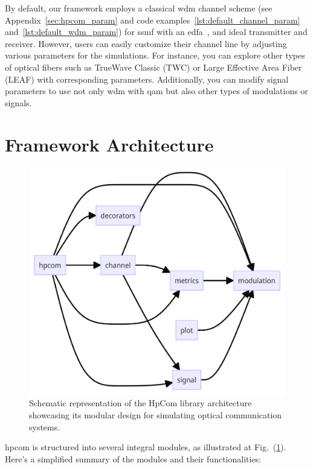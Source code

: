 By default, our framework employs a classical \acrshort{wdm} channel scheme (see Appendix~\ref{sec:hpcom_param} and code examples~\ref{lst:default_channel_param} and~\ref{lst:default_wdm_param}) for \acrshort{ssmf} with an \acrshort{edfa}~\cite{essiambre2010capacity}, and ideal transmitter and receiver. However, users can easily customize their channel line by adjusting various parameters for the simulations. For instance, you can explore other types of optical fibers such as TrueWave Classic\cite{taylor2002application} (TWC) or Large Effective Area Fiber\cite{charlet200972} (LEAF) with corresponding parameters. Additionally, you can modify signal parameters to use not only \acrshort{wdm} with \acrshort{qam} but also other types of modulations or signals.


\section{Framework Architecture}

\begin{figure}[t]
   \centering
        \includegraphics[width=0.7\linewidth]{images/hpcom/hpcom_sctructure.png}
    \caption{Schematic representation of the HpCom library architecture showcasing its modular design for simulating optical communication systems.}
    \label{fig:hpcom_arch}
\end{figure}

\Gls{hpcom} is structured into several integral modules, as illustrated at Fig.~(\ref{fig:hpcom_arch}). Here's a simplified summary of the modules and their functionalities:

